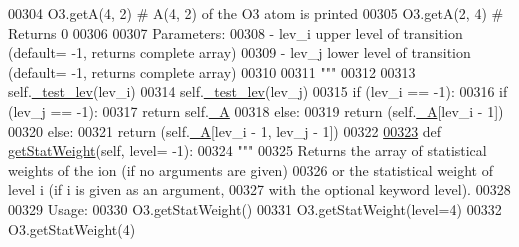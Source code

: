 \begin{DoxyCode}
00304 \textcolor{stringliteral}{            O3.getA(4, 2)      # A(4, 2) of the O3 atom is printed}
00305 \textcolor{stringliteral}{            O3.getA(2, 4)      # Returns 0}
00306 \textcolor{stringliteral}{}
00307 \textcolor{stringliteral}{        Parameters:}
00308 \textcolor{stringliteral}{            - lev\_i  upper level of transition (default= -1, returns complete array)}
00309 \textcolor{stringliteral}{            - lev\_j  lower level of transition (default= -1, returns complete array)}
00310 \textcolor{stringliteral}{            }
00311 \textcolor{stringliteral}{        """}
00312         
00313         self.\hyperlink{classpyneb_1_1utils_1_1pn__chianti_1_1___atom_chianti_a551f0c33c7ebec76c0af9e86befd29f3}{\_test\_lev}(lev\_i)
00314         self.\hyperlink{classpyneb_1_1utils_1_1pn__chianti_1_1___atom_chianti_a551f0c33c7ebec76c0af9e86befd29f3}{\_test\_lev}(lev\_j)
00315         \textcolor{keywordflow}{if} (lev\_i == -1):
00316             \textcolor{keywordflow}{if} (lev\_j == -1):
00317                 \textcolor{keywordflow}{return} self.\hyperlink{classpyneb_1_1utils_1_1pn__chianti_1_1___atom_chianti_a4d531860236fc5a6564cc861b28cabe7}{\_A}
00318             \textcolor{keywordflow}{else}:
00319                 \textcolor{keywordflow}{return} (self.\hyperlink{classpyneb_1_1utils_1_1pn__chianti_1_1___atom_chianti_a4d531860236fc5a6564cc861b28cabe7}{\_A}[lev\_i - 1])
00320         \textcolor{keywordflow}{else}:
00321             \textcolor{keywordflow}{return} (self.\hyperlink{classpyneb_1_1utils_1_1pn__chianti_1_1___atom_chianti_a4d531860236fc5a6564cc861b28cabe7}{\_A}[lev\_i - 1, lev\_j - 1])
00322 
\hypertarget{pn__chianti_8py_source_l00323}{}\hyperlink{classpyneb_1_1utils_1_1pn__chianti_1_1___atom_chianti_a6a02beb861a01f6349a3cd87681491f0}{00323}     \textcolor{keyword}{def }\hyperlink{classpyneb_1_1utils_1_1pn__chianti_1_1___atom_chianti_a6a02beb861a01f6349a3cd87681491f0}{getStatWeight}(self, level= -1):
00324         \textcolor{stringliteral}{"""}
00325 \textcolor{stringliteral}{        Returns the array of statistical weights of the ion (if no arguments are given) }
00326 \textcolor{stringliteral}{            or the statistical weight of level i (if i is given as an argument, }
00327 \textcolor{stringliteral}{            with the optional keyword level).}
00328 \textcolor{stringliteral}{            }
00329 \textcolor{stringliteral}{        Usage:}
00330 \textcolor{stringliteral}{            O3.getStatWeight()}
00331 \textcolor{stringliteral}{            O3.getStatWeight(level=4)}
00332 \textcolor{stringliteral}{            O3.getStatWeight(4)}

\end{DoxyCode}
